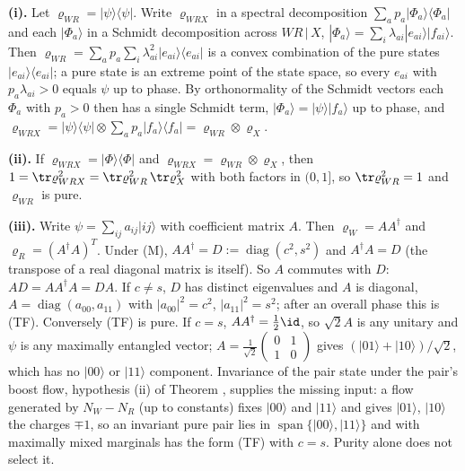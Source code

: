 \textbf{(i).} Let $\varrho_{WR} = |\psi\rangle\langle\psi|$. Write $\varrho_{WRX}$ in a spectral decomposition $\sum_a p_a|\Phi_a\rangle\langle\Phi_a|$ and each $|\Phi_a\rangle$ in a Schmidt decomposition across $WR \,|\, X$, $|\Phi_a\rangle = \sum_i \lambda_{ai}|e_{ai}\rangle|f_{ai}\rangle$. Then $\varrho_{WR} = \sum_a p_a\sum_i\lambda_{ai}^{2}|e_{ai}\rangle\langle e_{ai}|$ is a convex combination of the pure states $|e_{ai}\rangle\langle e_{ai}|$; a pure state is an extreme point of the state space, so every $e_{ai}$ with $p_a\lambda_{ai} > 0$ equals $\psi$ up to phase. By orthonormality of the Schmidt vectors each $\Phi_a$ with $p_a > 0$ then has a single Schmidt term, $|\Phi_a\rangle = |\psi\rangle|f_a\rangle$ up to phase, and $\varrho_{WRX} = |\psi\rangle\langle\psi| \otimes \sum_a p_a|f_a\rangle\langle f_a| = \varrho_{WR} \otimes \varrho_X$.

\textbf{(ii).} If $\varrho_{WRX} = |\Phi\rangle\langle\Phi|$ and $\varrho_{WRX} = \varrho_{WR}\otimes\varrho_X$, then $1 = \tr\varrho_{WRX}^{2} = \tr\varrho_{WR}^{2}\,\tr\varrho_X^{2}$ with both factors in $(0, 1]$, so $\tr\varrho_{WR}^{2} = 1$ and $\varrho_{WR}$ is pure.

\textbf{(iii).} Write $\psi = \sum_{ij}a_{ij}|ij\rangle$ with coefficient matrix $A$. Then $\varrho_W = AA^{\dagger}$ and $\varrho_R = (A^{\dagger}A)^{T}$. Under (M), $AA^{\dagger} = D := \operatorname{diag}(c^{2}, s^{2})$ and $A^{\dagger}A = D$ (the transpose of a real diagonal matrix is itself). So $A$ commutes with $D$: $AD = AA^{\dagger}A = DA$. If $c \neq s$, $D$ has distinct eigenvalues and $A$ is diagonal, $A = \operatorname{diag}(a_{00}, a_{11})$ with $|a_{00}|^{2} = c^{2}$, $|a_{11}|^{2} = s^{2}$; after an overall phase this is (TF). Conversely (TF) is pure. If $c = s$, $AA^{\dagger} = \tfrac12\id$, so $\sqrt2A$ is any unitary and $\psi$ is any maximally entangled vector; $A = \tfrac{1}{\sqrt2}\left(\begin{smallmatrix}0 & 1\\ 1 & 0\end{smallmatrix}\right)$ gives $(|01\rangle + |10\rangle)/\sqrt2$, which has no $|00\rangle$ or $|11\rangle$ component. Invariance of the pair state under the pair's boost flow, hypothesis (ii) of Theorem , supplies the missing input: a flow generated by $N_W - N_R$ (up to constants) fixes $|00\rangle$ and $|11\rangle$ and gives $|01\rangle$, $|10\rangle$ the charges $\mp 1$, so an invariant pure pair lies in $\operatorname{span}\{|00\rangle, |11\rangle\}$ and with maximally mixed marginals has the form (TF) with $c = s$. Purity alone does not select it.

